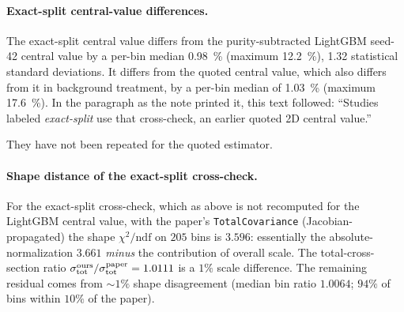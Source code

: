 \paragraph{Exact-split central-value differences.} The exact-split central value differs from the purity-subtracted LightGBM seed-42 central value by a per-bin median \SI{0.98}{\percent} (maximum \SI{12.2}{\percent}), 1.32 statistical standard deviations. It differs from the quoted central value, which also differs from it in background treatment, by a per-bin median of \SI{1.03}{\percent} (maximum \SI{17.6}{\percent}). In the paragraph as the note printed it, this text followed: ``Studies labeled \emph{exact-split} use that cross-check, an earlier quoted 2D central value.''\par They have not been repeated for the quoted estimator.

\paragraph{Shape distance of the exact-split cross-check.} For the exact-split cross-check, which as above is not recomputed for the LightGBM central value, with the paper's \texttt{TotalCovariance} (Jacobian-propagated) the shape $\chi^{2}/\mathrm{ndf}$ on $205$ bins is $\boxed{3.596}$: essentially the absolute-normalization $3.661$ \emph{minus} the contribution of overall scale. The total-cross-section ratio $\sigma_{\text{tot}}^{\text{ours}}/\sigma_{\text{tot}}^{\text{paper}} = 1.0111$ is a $1\%$ scale difference. The remaining residual comes from $\sim 1\%$ shape disagreement (median bin ratio $1.0064$; $94\%$ of bins within $10\%$ of the paper).

